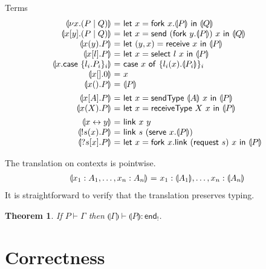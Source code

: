 \documentclass{easychair}
\makeatletter
\newtheorem{theorem}{Theorem}
\newcommand{\ba}{\begin{array}}
\newcommand{\ea}{\end{array}}
\newenvironment{equations}{\[\ba{@{}r@{~}c@{~}l@{}}}{\ea\]}
\newcommand{\key}{\mathsf}
\newcommand{\set}[1]{\{ #1 \}}
\newcommand{\cptogv}[1]{\llparenthesis{#1}\rrparenthesis}
\newcommand{\row}[2]{\set{#1}_{#2}}
\newcommand{\gvEndOutput}{\key{end}_!}
\newcommand{\cpj}[2]{{#1} \vdash {#2}}
\newcommand{\gvj}[3]{{#1} \vdash {#2} : {#3}}
\newcommand{\la}{l}
\newcommand{\G}{\Gamma}
\newcommand{\gvLink}[2]{\key{link}~{#1}~{#2}}
\newcommand{\gvPair}[2]{({#1},{#2})}
\newcommand{\gvLet}[3]{\key{let}~{#1}={#2}~\key{in}~{#3}}
\newcommand{\gvSend}[2]{\key{send}~{#1}~{#2}}
\newcommand{\gvReceive}[1]{\key{receive}~{#1}}
\newcommand{\gvSelect}[2]{\key{select}~{#1}~{#2}}
\newcommand{\gvCase}[2]{\key{case}~{#1}~\key{of}~{#2}}
\newcommand{\gvFork}[2]{\key{fork}~{#1}.{#2}}
\newcommand{\gvTerminate}[1]{\key{terminate}~{#1}}
\newcommand{\gvSendType}[2]{\key{sendType}~{#1}~{#2}}
\newcommand{\gvReceiveType}[2]{\key{receiveType}~{#1}~{#2}}
\newcommand{\gvServe}[2]{\key{serve}~{#1}.{#2}}
\newcommand{\gvRequest}[1]{\key{request}~{#1}}
\newcommand{\cpLink}[2]{{#1} \leftrightarrow {#2}}
\newcommand{\cpCut}[3]{\nu {#1}.({#2} \mid {#3})}
\newcommand{\cpOutput}[4]{{#1}[{#2}].({#3} \mid {#4})}
\newcommand{\cpInput}[3]{{#1}({#2}).{#3}}
\newcommand{\cpInject}[3]{{#1}[{#2}].{#3}}
\newcommand{\cpCase}[2]{{#1}.\key{case}~{#2}}
\newcommand{\cpServe}[3]{!{#1}({#2}).{#3}}
\newcommand{\cpRequest}[3]{?{#1}[{#2}].{#3}}
\newcommand{\cpEmptyOut}[1]{{#1}[].0}
\newcommand{\cpEmptyIn}[2]{{#1}().{#2}}
\newcommand{\cpSendType}[3]{{#1}[{#2}].{#3}}
\newcommand{\cpReceiveType}[3]{{#1}({#2}).{#3}}
\makeatother
\begin{document}
Terms
\begin{equations}
\cptogv{\cpCut{x}{P}{Q}} &=&
  \gvLet{x}{\gvFork{x}{\cptogv{P}}}{\cptogv{Q}} \\
\cptogv{\cpOutput{x}{y}{P}{Q}} &=&
  \gvLet{x}{\gvSend{(\gvFork{y}{\cptogv{P}})}{x}}{\cptogv{Q}} \\
\cptogv{\cpInput{x}{y}{P}} &=&
  \gvLet{\gvPair{y}{x}}{\gvReceive{x}}{\cptogv{P}} \\
\cptogv{\cpInject{x}{\la}{P}} &=&
  \gvLet{x}{\gvSelect{\la}{x}}{\cptogv{P}} \\
\cptogv{\cpCase{x}{\row{\la_i.P_i}{i}}} &=&
  \gvCase{x}{\row{\la_i(x).\cptogv{P_i}}{i}} \\
\cptogv{\cpEmptyOut{x}} &=& x \\
\cptogv{\cpEmptyIn{x}{P}} &=& \cptogv{P} \\[1ex]

\cptogv{\cpSendType{x}{A}{P}} &=&
  \gvLet{x}{\gvSendType{\cptogv{A}}{x}}{\cptogv{P}} \\
\cptogv{\cpReceiveType{x}{X}{P}} &=&
  \gvLet{x}{\gvReceiveType{X}{x}}{\cptogv{P}} \\[1ex]

\cptogv{\cpLink{x}{y}} &=& \gvLink{x}{y} \\
\cptogv{\cpServe{s}{x}{P}} &=&
  \gvLink{s}{(\gvServe{x}{\cptogv{P}})} \\
\cptogv{\cpRequest{s}{x}{P}} &=&
  \gvLet{x}{\gvFork{x}{\gvLink{(\gvRequest{s})}{x}}}{\cptogv{P}} \\
\end{equations}


The translation on contexts is pointwise.
\begin{equations}
\cptogv{x_1:A_1, \dots, x_n:A_n} &=& x_1:\cptogv{A_1}, \dots, x_n:\cptogv{A_n} \\
\end{equations}%
It is straightforward to verify that the translation preserves typing.
\begin{theorem}
If $\cpj{P}{\G}$ then $\gvj{\cptogv{\G}}{\cptogv{P}}{\gvEndOutput}$.
\end{theorem}


\section{Correctness}
\end{document}
